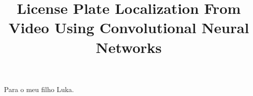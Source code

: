 \documentclass[oneside,a4paper,12pt]{normas-utf-tex}
\title{License Plate Localization From Video Using Convolutional Neural Networks}
\begin{document}
\setcounter{figure}{200}

\capa

\folhaderosto


\begin{dedicatoria}
	Para o meu filho Luka.
\end{dedicatoria}


\begin{resumo}
	
\end{resumo}

\begin{abstract}
	
\end{abstract}


\listadefiguras
\listadetabelas
\listadesiglas

\sumario






\apendice

%

%
%
\end{document}
